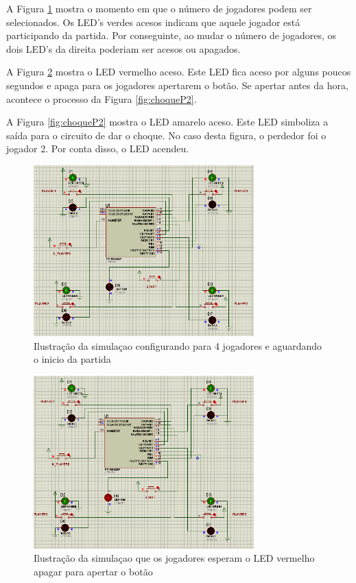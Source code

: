 \documentclass[article]{IEEEtran}
\begin{document}
A Figura \ref{fig:4jogadores} mostra o momento em que o número de jogadores podem ser selecionados. Os LED's verdes acesos indicam que aquele jogador está participando da partida. Por conseguinte, ao mudar o número de jogadores, os dois LED's da direita poderiam ser acesos ou apagados.

A Figura \ref{fig:delaystart} mostra o LED vermelho aceso. Este LED fica aceso por alguns poucos segundos e apaga para os jogadores apertarem o botão. Se apertar antes da hora, acontece o processo da Figura \ref{fig:choqueP2}.

A Figura \ref{fig:choqueP2} mostra o LED amarelo aceso. Este LED simboliza a saída para o circuito de dar o choque. No caso desta figura, o perdedor foi o jogador 2. Por conta disso, o LED acendeu.

	\begin{figure}	
		\centering
		\includegraphics[width=8.5cm]{./4jogadores.png}
		\caption{Ilustração da simulaçao configurando para 4 jogadores e aguardando o inicio da partida}
 		\label{fig:4jogadores}
	\end{figure}
	
	\begin{figure}	
		\centering
		\includegraphics[width=8.5cm]{./delaystart.png}
		\caption{Ilustração da simulaçao que os jogadores esperam o LED vermelho apagar para apertar o botão}
 		\label{fig:delaystart}
	\end{figure}
\end{document}
